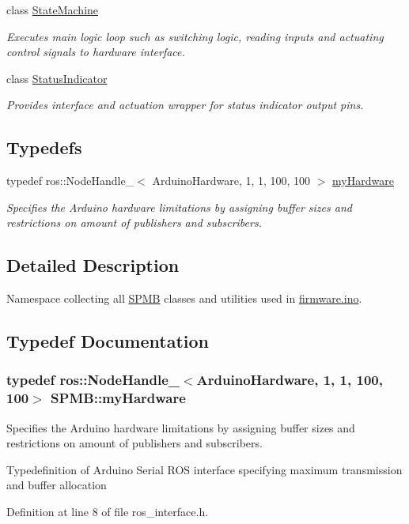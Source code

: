 \begin{DoxyCompactItemize}
class \hyperlink{classSPMB_1_1StateMachine}{State\+Machine}
\begin{DoxyCompactList}\small\item\em Executes main logic loop such as switching logic, reading inputs and actuating control signals to hardware interface. \end{DoxyCompactList}\item 
class \hyperlink{classSPMB_1_1StatusIndicator}{Status\+Indicator}
\begin{DoxyCompactList}\small\item\em Provides interface and actuation wrapper for status indicator output pins. \end{DoxyCompactList}\end{DoxyCompactItemize}
\subsection*{Typedefs}
\begin{DoxyCompactItemize}
\item 
typedef ros\+::\+Node\+Handle\+\_\+$<$ Arduino\+Hardware, 1, 1, 100, 100 $>$ \hyperlink{namespaceSPMB_a3dfee893976eb910fb3de34c228c2314}{my\+Hardware}
\begin{DoxyCompactList}\small\item\em Specifies the Arduino hardware limitations by assigning buffer sizes and restrictions on amount of publishers and subscribers. \end{DoxyCompactList}\end{DoxyCompactItemize}


\subsection{Detailed Description}
Namespace collecting all \hyperlink{namespaceSPMB}{S\+P\+MB} classes and utilities used in \hyperlink{firmware_8ino_source}{firmware.\+ino}. 

\subsection{Typedef Documentation}
\subsubsection[{\texorpdfstring{my\+Hardware}{myHardware}}]{\setlength{\rightskip}{0pt plus 5cm}typedef ros\+::\+Node\+Handle\+\_\+$<$Arduino\+Hardware, 1, 1, 100, 100$>$ {\bf S\+P\+M\+B\+::my\+Hardware}}\hypertarget{namespaceSPMB_a3dfee893976eb910fb3de34c228c2314}{}\label{namespaceSPMB_a3dfee893976eb910fb3de34c228c2314}


Specifies the Arduino hardware limitations by assigning buffer sizes and restrictions on amount of publishers and subscribers. 

Typedefinition of Arduino Serial R\+OS interface specifying maximum transmission and buffer allocation 

Definition at line 8 of file ros\+\_\+interface.\+h.

